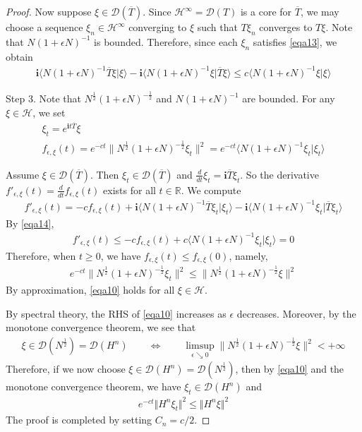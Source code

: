 \documentclass[12pt,b5paper,notitlepage]{article}
\theoremstyle{definition}
\theoremstyle{plain}
\newcommand{\mc}{\mathcal}
\newcommand{\ovl}{\overline}
\newcommand{\Dom}{\scr{D}}
\newcommand{\bk}[1]{\langle {#1}\rangle}
\newcommand{\scr}{\mathscr}
\newcommand{\im}{\mathbf{i}}
\newcommand{\Rbb}{\mathbb R}
\numberwithin{equation}{section}
\begin{document}
\begin{proof}
Now suppose $\xi\in\Dom(\ovl T)$. Since $\mc H^\infty=\Dom(T)$ is a core for $\ovl T$, we may choose a sequence $\xi_n\in\mc H^\infty$ converging to $\xi$ such that $T\xi_n$ converges to $T\xi$. Note that $N(1+\epsilon N)^{-1}$ is bounded. Therefore, since each $\xi_n$ satisfies \eqref{eqa13}, we obtain
\begin{align*}
\im\bk{N(1+\epsilon N)^{-1}\ovl T\xi|\xi}-\im\bk{N(1+\epsilon N)^{-1}\xi|\ovl T\xi}	\leq 	c\bk{N(1+\epsilon N)^{-1}\xi|\xi}\tag{c}\label{eqa14}
\end{align*}


Step 3. Note that $N^{\frac 12}(1+\epsilon N)^{-\frac 12}$ and $N(1+\epsilon N)^{-1}$ are  bounded. For any $\xi\in\mc H$, we set
\begin{gather*}
\xi_t=e^{\im t\ovl T}\xi\\
f_{\epsilon,\xi}(t)=	e^{-ct}\big\lVert{N^{\frac 12}(1+\epsilon N)^{-\frac 12}\xi_t}\big\lVert^2=e^{-ct}\bk{N(1+\epsilon N)^{-1}\xi_t|\xi_t}
\end{gather*}


Assume $\xi\in\Dom(\ovl T)$. Then $\xi_t\in\Dom(\ovl T)$ and $\frac d{dt}\xi_t=\im\ovl T\xi_t$. So the derivative $f'_{\epsilon,\xi}(t)=\frac d{dt}f_{\epsilon,\xi}(t)$ exists for all $t\in\Rbb$.  We compute
\begin{align*}
f'_{\epsilon,\xi}(t)=-cf_{\epsilon,\xi}(t)+\im\bk{N(1+\epsilon N)^{-1}\ovl T\xi_t|\xi_t}-\im\bk{N(1+\epsilon N)^{-1}\xi_t|\ovl T\xi_t}\tag{d}\label{eqa9}
\end{align*}
By \eqref{eqa14},
\begin{align*}
f'_{\epsilon,\xi}(t)\leq-cf_{\epsilon,\xi}(t)+c\bk{N(1+\epsilon N)^{-1}\xi_t|\xi_t}=0
\end{align*}
Therefore, when $t\geq 0$, we have $f_{\epsilon,\xi}(t)\leq f_{\epsilon,\xi}(0)$, namely,
\begin{align}
e^{-ct}\big\lVert{N^{\frac 12}(1+\epsilon N)^{-\frac 12}\xi_t}\big\lVert^2\leq \big\lVert{N^{\frac 12}(1+\epsilon N)^{-\frac 12}\xi}\big\lVert^2\tag{e}\label{eqa10}
\end{align}
By approximation, \eqref{eqa10} holds for all $\xi\in\mc H$.

By spectral theory, the RHS of \eqref{eqa10} increases as $\epsilon$ decreases. Moreover, by the monotone convergence theorem, we see that
\begin{align*}
\xi\in\Dom(N^{\frac12})=\Dom(H^n)\qquad\Longleftrightarrow\qquad\limsup_{\epsilon\searrow0}\big\lVert{N^{\frac 12}(1+\epsilon N)^{-\frac 12}\xi}\big\lVert^2<+\infty
\end{align*}
Therefore, if we now choose $\xi\in\Dom(H^n)=\Dom(N^{\frac 12})$, then by \eqref{eqa10} and the monotone convergence theorem, we have $\xi_t\in\Dom(H^n)$ and 
\begin{align*}
e^{-ct}\Vert H^n\xi_t\Vert^2\leq \Vert H^n\xi\Vert^2
\end{align*}
The proof is completed by setting $C_n=c/2$.
\end{proof}
\end{document}
